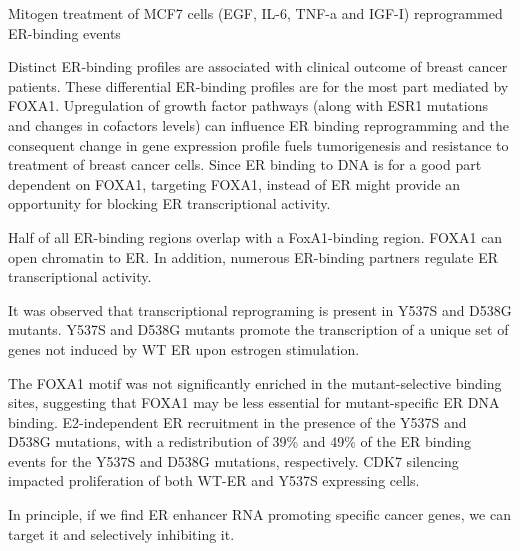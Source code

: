 Mitogen treatment of MCF7 cells (EGF, IL-6, TNF-a and IGF-I) reprogrammed ER-binding events

Distinct ER-binding profiles are associated with clinical outcome of breast cancer patients. These differential ER-binding profiles are for the most part mediated by FOXA1. Upregulation of growth factor pathways (along with ESR1 mutations and changes in cofactors levels) can influence ER binding reprogramming and the consequent change in gene expression profile fuels tumorigenesis and resistance to treatment of breast cancer cells. Since ER binding to DNA is for a good part dependent on FOXA1, targeting FOXA1, instead of ER might provide an opportunity for blocking ER transcriptional activity.

Half of all ER-binding regions overlap with a FoxA1-binding region. FOXA1 can open chromatin to ER. In addition, numerous ER-binding partners regulate ER transcriptional activity.

It was observed that transcriptional reprograming is present in Y537S and D538G mutants. Y537S and D538G mutants promote the transcription of a unique set of genes not induced by WT ER upon estrogen stimulation.

The FOXA1 motif was not significantly enriched in the mutant-selective binding sites, suggesting that FOXA1 may be less essential for mutant-specific ER DNA binding. E2-independent ER recruitment in the presence of the Y537S and D538G mutations, with a redistribution of 39\% and 49\% of the ER binding events for the Y537S and D538G mutations, respectively. CDK7 silencing impacted proliferation of both WT-ER and Y537S expressing cells.

In principle, if we find ER enhancer RNA promoting specific cancer genes, we can target it and selectively inhibiting it.
